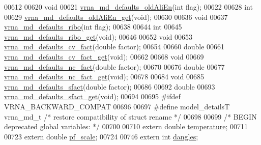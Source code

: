 \begin{DoxyCode}
00612 
00620 \textcolor{keywordtype}{void}
00621 \hyperlink{group__model__details_ga41521d5b9fb7e0f31e7ea73f5792afab}{vrna\_md\_defaults\_oldAliEn}(\textcolor{keywordtype}{int} flag);
00622 
00628 \textcolor{keywordtype}{int}
00629 \hyperlink{group__model__details_ga2374492b5019df88022fe4c05f0f3630}{vrna\_md\_defaults\_oldAliEn\_get}(\textcolor{keywordtype}{void});
00630 
00636 \textcolor{keywordtype}{void}
00637 \hyperlink{group__model__details_ga937c45e1d06fd6168730a9b08d130be3}{vrna\_md\_defaults\_ribo}(\textcolor{keywordtype}{int} flag);
00638 
00644 \textcolor{keywordtype}{int}
00645 \hyperlink{group__model__details_ga169027f0c0561ea7d87b655e4b336bfc}{vrna\_md\_defaults\_ribo\_get}(\textcolor{keywordtype}{void});
00646 
00652 \textcolor{keywordtype}{void}
00653 \hyperlink{group__model__details_gad3a3f40baafd91a6ce80a91a68e20053}{vrna\_md\_defaults\_cv\_fact}(\textcolor{keywordtype}{double} factor);
00654 
00660 \textcolor{keywordtype}{double}
00661 \hyperlink{group__model__details_gae59c68393807217b0a2497adb64d3ee3}{vrna\_md\_defaults\_cv\_fact\_get}(\textcolor{keywordtype}{void});
00662 
00668 \textcolor{keywordtype}{void}
00669 \hyperlink{group__model__details_gac35e596c850dce3ad55c49119fd7d471}{vrna\_md\_defaults\_nc\_fact}(\textcolor{keywordtype}{double} factor);
00670 
00676 \textcolor{keywordtype}{double}
00677 \hyperlink{group__model__details_ga7ac759eaa7159bf5f022745f5da59508}{vrna\_md\_defaults\_nc\_fact\_get}(\textcolor{keywordtype}{void});
00678 
00684 \textcolor{keywordtype}{void}
00685 \hyperlink{group__model__details_ga3f73d3029d3d0025d4cc311510cd95a3}{vrna\_md\_defaults\_sfact}(\textcolor{keywordtype}{double} factor);
00686 
00692 \textcolor{keywordtype}{double}
00693 \hyperlink{group__model__details_gab2df6aab954b63fd3592d18e90285dae}{vrna\_md\_defaults\_sfact\_get}(\textcolor{keywordtype}{void});
00694 
00695 \textcolor{preprocessor}{#ifdef  VRNA\_BACKWARD\_COMPAT}
00696 
00697 \textcolor{preprocessor}{#define model\_detailsT        vrna\_md\_t               }\textcolor{comment}{/* restore compatibility of struct rename */}\textcolor{preprocessor}{}
00698 
00699 \textcolor{comment}{/* BEGIN deprecated global variables: */}
00700 
00710 \textcolor{keyword}{extern} \textcolor{keywordtype}{double} \hyperlink{structvrna__md__s_a5f7e5c2b65bada5188443470e576aa4b}{temperature};
00711 
00723 \textcolor{keyword}{extern} \textcolor{keywordtype}{double} \hyperlink{group__model__details_gad3b22044065acc6dee0af68931b52cfd}{pf\_scale};
00724 
00746 \textcolor{keyword}{extern} \textcolor{keywordtype}{int}  \hyperlink{structvrna__md__s_adcda4ff2ea77748ae0e8700288282efc}{dangles};

\end{DoxyCode}
